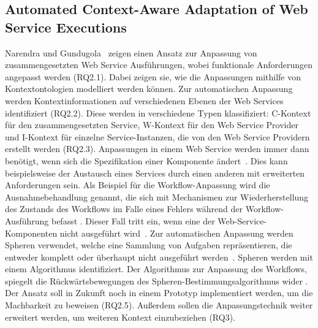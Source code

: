 \documentclass[conference,compsoc]{IEEEtran}
\begin{document}
\subsection{Automated Context-Aware Adaptation of Web Service Executions}
Narendra und Gundugola~\cite{narendra2006automated} zeigen einen Ansatz zur Anpassung von zusammengesetzten Web Service Ausführungen, wobei funktionale Anforderungen angepasst werden (RQ2.1). Dabei zeigen sie, wie die Anpassungen mithilfe von Kontextontologien modelliert werden können. Zur automatischen Anpassung werden Kontextinformationen auf verschiedenen Ebenen der Web Services identifiziert (RQ2.2). Diese werden in verschiedene Typen klassifiziert: C-Kontext für den zusammengesetzten Service, W-Kontext für den Web Service Provider und I-Kontext für einzelne Service-Instanzen, die von den Web Service Providern erstellt werden (RQ2.3)\cite{narendra2006automated}. Anpassungen in einem Web Service werden immer dann benötigt, wenn sich die Spezifikation einer Komponente ändert~\cite{narendra2006automated}. Dies kann beispielsweise der Austausch eines Services durch einen anderen mit erweiterten Anforderungen sein.
Als Beispiel für die Workflow-Anpassung wird die Ausnahmebehandlung genannt, die sich mit Mechanismen zur Wiederherstellung des Zustands des Workflows im Falle eines Fehlers während der Workflow-Ausführung befasst \cite{narendra2006automated}. Dieser Fall tritt ein, wenn eine der Web-Service-Komponenten nicht ausgeführt wird~\cite{narendra2006automated}.
Zur automatischen Anpassung werden Spheren verwendet, welche eine Sammlung von Aufgaben repräsentieren, die entweder komplett oder überhaupt nicht ausgeführt werden~\cite{narendra2006automated}. Spheren werden mit einem Algorithmus identifiziert. Der Algorithmus zur Anpassung des Workflows, spiegelt die Rückwärtsbewegungen des Spheren-Bestimmungsalgorithmus wider \cite{narendra2006automated}.
Der Ansatz soll in Zukunft noch in einem Prototyp implementiert werden, um die Machbarkeit zu beweisen (RQ2.5). Außerdem sollen die Anpassungstechnik weiter erweitert werden, um weiteren Kontext einzubeziehen (RQ3).
\end{document}
